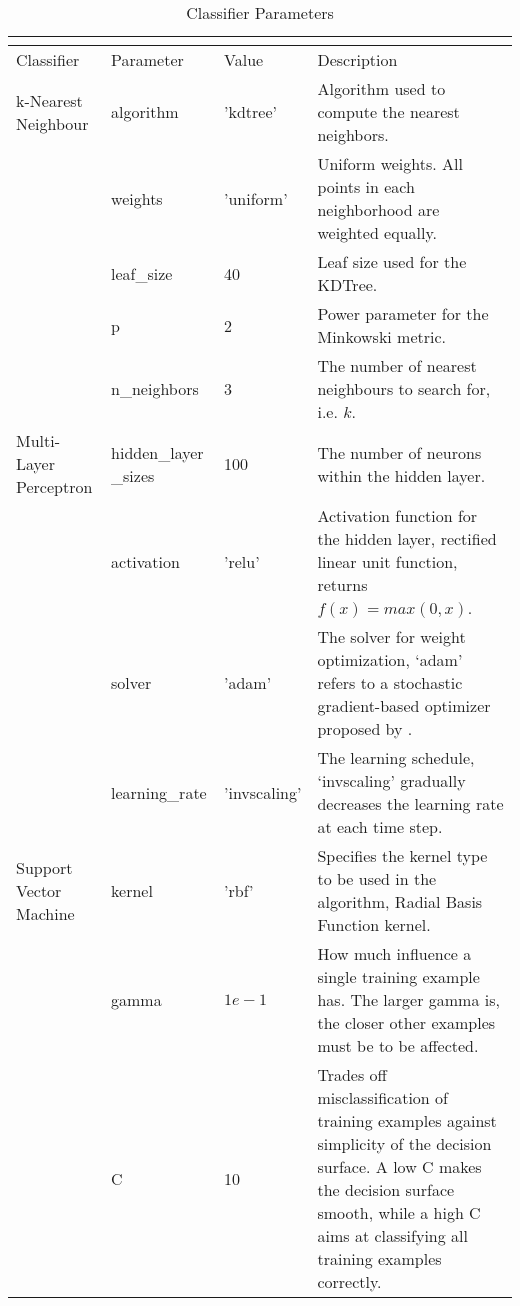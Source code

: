 \begin{small}
\begin{longtable}{@{}p{2cm}p{2.5cm}p{1.7cm}p{6.0cm}@{}}
\caption{Classifier Parameters} \\
\label{params} \\
\toprule
Classifier & Parameter & Value & Description \\ \midrule
k-Nearest Neighbour & algorithm & 'kdtree' & Algorithm used to compute the nearest neighbors. \\
    & weights & 'uniform' &  Uniform weights. All points in each neighborhood are weighted equally. \\
    & leaf\_size & 40 & Leaf size used for the KDTree. \\
    & p & 2 & Power parameter for the Minkowski metric. \\
 & n\_neighbors & 3 & The number of nearest neighbours to search for, i.e. $k$. \\
Multi-Layer Perceptron & hidden\_layer \_sizes & 100 & The number of neurons within the hidden layer. \\
		       & activation & 'relu' & Activation function for the hidden layer, rectified linear unit function, returns \newline $ f(x) = max(0, x) $. \\
	 & solver & 'adam' & The solver for weight optimization, ‘adam’ refers to a stochastic gradient-based optimizer proposed by \cite{kingma2014adam}. \\
  & learning\_rate & 'invscaling' & The learning schedule, ‘invscaling’ gradually decreases the learning rate at each time step. \\
Support Vector Machine & kernel & 'rbf' & Specifies the kernel type to be used in the algorithm, Radial Basis Function kernel. \\
		       & gamma & $ 1e-1 $ & How much influence a single training example has. The larger gamma is, the closer other examples must be to be affected. \\
	 & C & 10 & Trades off misclassification of training examples against simplicity of the decision surface. A low C makes the decision surface smooth, while a high C aims at classifying all training examples correctly. \\ \bottomrule
\end{longtable}
\end{small}
